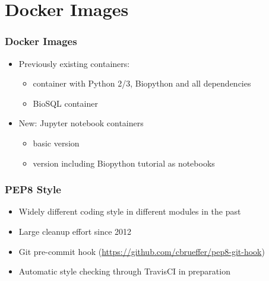\documentclass[trans]{beamer}
\begin{document}

\section{Docker Images}
\frame
{
  \frametitle{Docker Images}

  \begin{itemize}
  \item Previously existing containers:
    \begin{itemize}
    \item container with Python 2/3, Biopython and all dependencies
    \item BioSQL container
  \end{itemize}
  \item New: Jupyter notebook containers
    \begin{itemize}
      \item basic version
      \item version including Biopython tutorial as notebooks
    \end{itemize}
  \end{itemize}
}


\frame
{
  \frametitle{PEP8 Style}
  
  \begin{itemize}
  \item Widely different coding style in different modules in the past
  \item Large cleanup effort since 2012
  \item Git pre-commit hook (\url{https://github.com/cbrueffer/pep8-git-hook})
  \item Automatic style checking through TravisCI in preparation
  \end{itemize}
}
\end{document}
